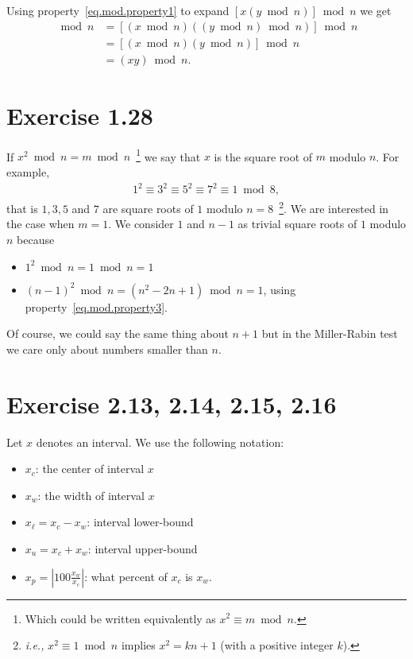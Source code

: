 \documentclass[12pt,a4paper]{article}
\newcommand{\abs}[1]{\left|#1\right|}
\begin{document}
Using property~\eqref{eq.mod.property1} to expand $[x(y\bmod n)]\bmod n$ we get
\begin{align*}
  [x(y\bmod n)]\bmod n
  &= [(x\bmod n)((y\bmod n)\bmod n)]\bmod n \\
  &= [(x\bmod n)(y\bmod n)]\bmod n \\
  &= (xy)\bmod n.
\end{align*}

\section{Exercise 1.28}

If $x^2 \bmod n = m \bmod n$~\footnote{Which could be written equivalently as $x^2
\equiv m \bmod n$.} we say that $x$ is the square root of $m$ modulo $n$. For example,
\begin{align*}
  1^2 \equiv 3^2 \equiv 5^2 \equiv 7^2 \equiv 1 \bmod 8,
\end{align*}
that is $1, 3, 5$ and $7$ are square roots of $1$ modulo $n=8$~\footnote{\emph{i.e.,}
$x^2 \equiv 1 \bmod n$ implies $x^2 = kn + 1$ (with a positive integer $k$).}. We are
interested in the case when $m = 1$. We consider $1$ and $n-1$ as trivial square roots
of $1$ modulo $n$ because
\begin{itemize}
\item $1^2 \bmod n = 1 \bmod n = 1$
\item $(n-1)^2 \bmod n = (n^2 - 2n + 1) \bmod n = 1$, using property~\eqref{eq.mod.property3}.
\end{itemize}
Of course, we could say the same thing about $n+1$ but in the Miller-Rabin test we care
only about numbers smaller than $n$.

\section{Exercise 2.13, 2.14, 2.15, 2.16}

Let $x$ denotes an interval. We use the following notation:
\begin{itemize}
\item $x_c$: the center of interval $x$
\item $x_w$: the width of interval $x$
\item $x_{\ell} = x_c - x_w$: interval lower-bound
\item $x_{u} = x_c + x_w$: interval upper-bound
\item $x_p = \abs{100\frac{x_w}{x_c}}$: what percent of $x_c$ is $x_w$.
\end{itemize}
\end{document}
